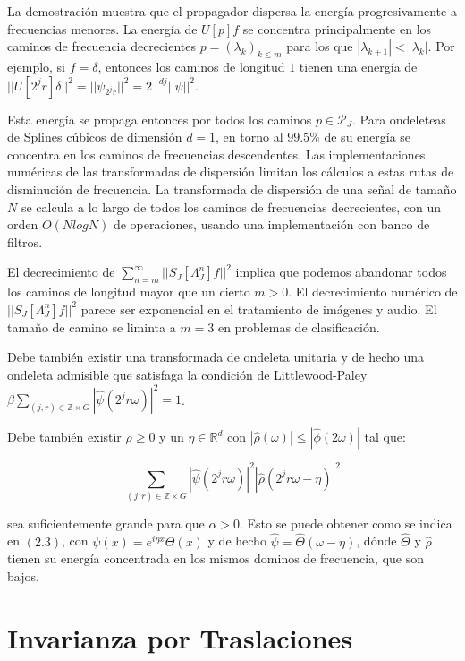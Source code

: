 \medskip 

\noindent La demostración muestra que el propagador dispersa la energía progresivamente a frecuencias menores. La energía de $U[p]f$ se concentra principalmente en los caminos de frecuencia decrecientes $p=(\lambda_k)_{k\leq m}$ para los que $|\lambda_{k+1}|<|\lambda_k|$. Por ejemplo, si $f=\delta$, entonces los caminos de longitud $1$ tienen una energía de $||U[2^jr]\delta||^2=||\psi_{2^jr}||^2=2^{-dj}||\psi||^2$. 

\noindent Esta energía se propaga entonces por todos los caminos $p\in\mathcal{P}_J$. Para ondeleteas de Splines cúbicos de dimensión $d=1$, en torno al $99.5 \%$ de su energía se concentra en los caminos de frecuencias descendentes. Las implementaciones numéricas de las transformadas de dispersión limitan los cálculos a estas rutas de disminución de frecuencia. La transformada de dispersión de una señal de tamaño $N$  se calcula a lo largo de todos los caminos de frecuencias decrecientes, con un orden $O(N logN)$ de operaciones, usando una implementación con banco de filtros.

\medskip

\noindent El decrecimiento de $\sum_{n=m}^\infty || S_J[\Lambda_J^n]f||^2$ implica que podemos abandonar todos los caminos de longitud mayor que un cierto $m>0$. El decrecimiento numérico de $||S_J[\Lambda_J^n]f||^2$ parece ser exponencial en el tratamiento de imágenes y audio. El tamaño de camino se liminta a $m=3$ en problemas de clasificación.

\medskip

\noindent Debe también existir una transformada de ondeleta unitaria y de hecho una ondeleta admisible que satisfaga la condición de Littlewood-Paley $\beta \sum_{(j,r)\in \mathbb{Z}\times G}|\widehat{\psi}(2^jr\omega)|^2=1$. 

\noindent Debe también existir $\rho \geq 0$ y un $\eta \in \mathbb{R}^d$ con $|\widehat{\rho}(\omega)|\leq |\widehat{\phi}(2\omega)|$ tal que: 

$$\sum_{(j,r)\in\mathbb{Z}\times G}|\widehat{\psi}(2^jr\omega)|^2|\widehat{\rho}(2^jr\omega-\eta)|^2$$

\noindent sea suficientemente grande para que $\alpha>0$. Esto se puede obtener como se indica en $(2.3)$, con $\psi(x)=e^{i\eta x}\Theta(x)$ y de hecho $\widehat{\psi}=\widehat{\Theta}(\omega-\eta)$, dónde $\widehat{\Theta}$ y $\widehat{\rho}$ tienen su energía concentrada en los mismos dominos de frecuencia, que son bajos.

\section{Invarianza por Traslaciones} \label{ch:seccion14}

